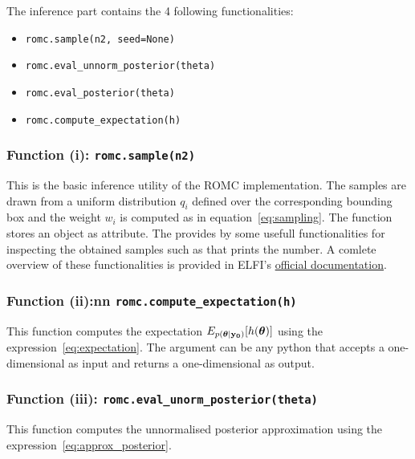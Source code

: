 The inference part contains the 4 following functionalities:

\begin{itemize}
\item \texttt{romc.sample(n2, seed=None)}
\item \texttt{romc.eval_unnorm_posterior(theta)}
\item \texttt{romc.eval_posterior(theta)}
\item \texttt{romc.compute_expectation(h)}
\end{itemize}

\subsubsection*{Function (i): \texttt{romc.sample(n2)}}

This is the basic inference utility of the ROMC implementation. The
samples are drawn from a uniform distribution $q_i$ defined over the
corresponding bounding box and the weight $w_i$ is computed as in
equation~\eqref{eq:sampling}. The function stores an
 object as  attribute. The
 provides by some usefull functionalities for
inspecting the obtained samples such as
 that prints the number. A comlete
overview of these functionalities is provided in ELFI's
\href{https://elfi.readthedocs.io/en/latest/api.html#elfi.methods.results.Sample}{official
  documentation}.

\subsubsection*{Function (ii):nn
  \texttt{romc.compute_expectation(h)}}

This function computes the expectation
$E_{p(\boldsymbol{\theta}|\mathbf{y_0})}[h(\boldsymbol{\theta})]$ using the
expression~\eqref{eq:expectation}. The argument  can be
any python  that accepts a one-dimensional
 as input and returns a one-dimensional
 as output.

\subsubsection*{Function (iii):
  \texttt{romc.eval_unorm_posterior(theta)}}

This function computes the unnormalised posterior approximation using
the expression~\eqref{eq:approx_posterior}.

